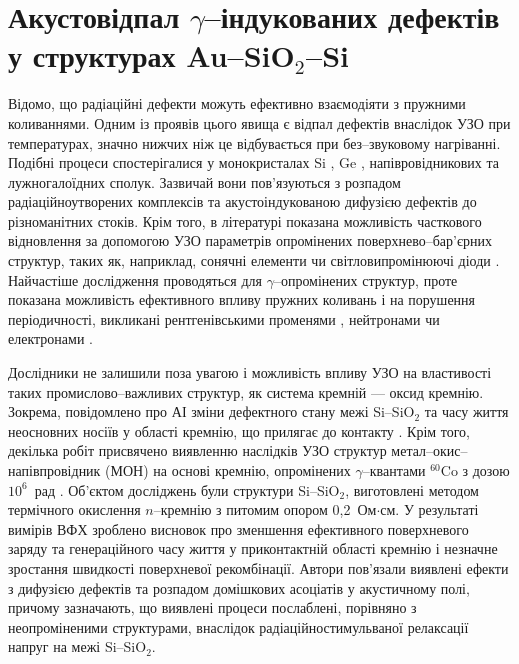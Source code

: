 \section{Акустовідпал $\gamma$--індукованих дефектів у структурах Au--SiO$_2$--Si}

Відомо, що радіаційні дефекти можуть ефективно взаємодіяти з пружними коливаннями.
Одним із проявів цього явища є відпал дефектів внаслідок УЗО при температурах, значно нижчих ніж це відбувається при без--звуковому нагріванні.
Подібні процеси спостерігалися у монокристалах Si \cite{OstrovRadSi,Podolian2012r,PodolHivr,YOlikh2006TPLr}, Ge \cite{Olikh:FTP1996},
напівровідникових \cite{OlikhProc,OstrovFTTRad} та лужногалоїдних \cite{UST:OstrovCsI} сполук.
Зазвичай вони пов'язуються з розпадом радіаційноутворених комплексів та акустоіндукованою дифузією дефектів до різноманітних стоків.
Крім того, в літературі показана можливість часткового відновлення за допомогою УЗО параметрів опромінених поверхнево--бар'єрних структур, таких як, наприклад,
сонячні елементи \cite{YOlikh2007TPLr} чи світловипромінюючі діоди \cite{US:LED,UST:LED_SM}.
Найчастіше дослідження проводяться для $\gamma$--опромінених структур, проте показана можливість ефективного впливу пружних коливань і на порушення періодичності, викликані
рентгенівськими променями \cite{UST:OstrovCsI}, нейтронами \cite{Olikh:FTP1996} чи електронами \cite{US:LED,UST:LED_SM}.

   Дослідники не залишили поза увагою і можливість впливу УЗО на властивості таких промислово--важливих структур, як система
кремній --- оксид кремнію.
Зокрема, повідомлено про АІ зміни дефектного стану межі  Si--SiO$_2$ \cite{Ostap:SiO2,UST:Medvid,Zaver:2008r} та часу життя неосновних носіїв у області кремнію,
що прилягає до контакту \cite{Parchinskii2003r,Zdeb1989}.
Крім того, декілька робіт присвячено виявленню наслідків УЗО структур метал--окис--напівпровідник (МОН) на основі кремнію, опромінених $\gamma$--квантами $^{60}$Co з дозою $10^6$~рад \cite{Parchinskii2000r,Parchinskii2006r}.
Об'єктом досліджень були структури Si--SiO$_2$, виготовлені методом термічного окислення $n$--кремнію з питомим опором 0,2~Ом$\cdot$см.
У результаті вимірів ВФХ зроблено висновок про зменшення ефективного поверхневого заряду та генераційного часу життя у приконтактній області кремнію і незначне
зростання швидкості поверхневої рекомбінації.
Автори пов'язали виявлені ефекти з дифузією дефектів та розпадом домішкових асоціатів у акустичному полі, причому зазначають, що виявлені процеси
послаблені, порівняно з неопроміненими структурами, внаслідок радіаційностимульваної релаксації напруг на межі Si--SiO$_2$.

